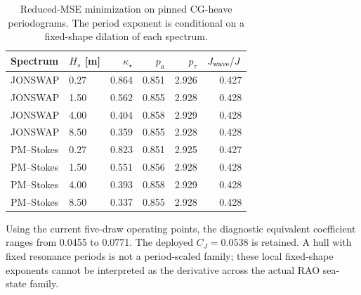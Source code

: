 \begin{table}[t]\centering
\caption{Reduced-MSE minimization on pinned CG-heave periodograms.
The period exponent is conditional on a fixed-shape dilation of each spectrum.}
\label{tab:adapt-exact-mse-exponents}\footnotesize
\begin{tabular}{@{}llrrrr@{}}\toprule
Spectrum & $H_s$ [m] & $\kappa_\star$ & $p_a$ & $p_\tau$ & $J_{\rm wave}/J$ \\
\midrule
JONSWAP & 0.27 & 0.864 & 0.851 & 2.926 & 0.427 \\
JONSWAP & 1.50 & 0.562 & 0.855 & 2.928 & 0.428 \\
JONSWAP & 4.00 & 0.404 & 0.858 & 2.929 & 0.428 \\
JONSWAP & 8.50 & 0.359 & 0.855 & 2.928 & 0.428 \\
PM--Stokes & 0.27 & 0.823 & 0.851 & 2.925 & 0.427 \\
PM--Stokes & 1.50 & 0.551 & 0.856 & 2.928 & 0.428 \\
PM--Stokes & 4.00 & 0.393 & 0.858 & 2.929 & 0.428 \\
PM--Stokes & 8.50 & 0.337 & 0.855 & 2.928 & 0.428 \\
\bottomrule\end{tabular}\end{table}
Using the current five-draw operating points, the diagnostic equivalent
coefficient ranges from \num{0.0455} to \num{0.0771}.
The deployed $C_J=0.0538$ is retained. A hull with fixed resonance periods
is not a period-scaled family; these local fixed-shape exponents cannot
be interpreted as the derivative across the actual RAO sea-state family.
